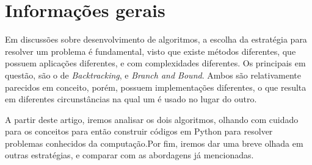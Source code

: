 \section{Informações gerais}

Em discussões sobre desenvolvimento de algoritmos, a escolha da estratégia para 
resolver um problema é fundamental, visto que existe métodos diferentes, que 
possuem aplicações diferentes, e com complexidades diferentes. Os principais
em questão, são o de \emph{Backtracking}, e \emph{Branch and Bound}. Ambos são relativamente
parecidos em conceito, porém, possuem implementações diferentes, o que resulta em diferentes
circunstâncias na qual um é usado no lugar do outro.

A partir deste artigo, iremos analisar os dois algoritmos, olhando com cuidado para os conceitos 
para então construir códigos em Python para resolver problemas conhecidos da computação.Por fim, 
iremos dar uma breve olhada em outras estratégias, e comparar com as abordagens
já mencionadas.
